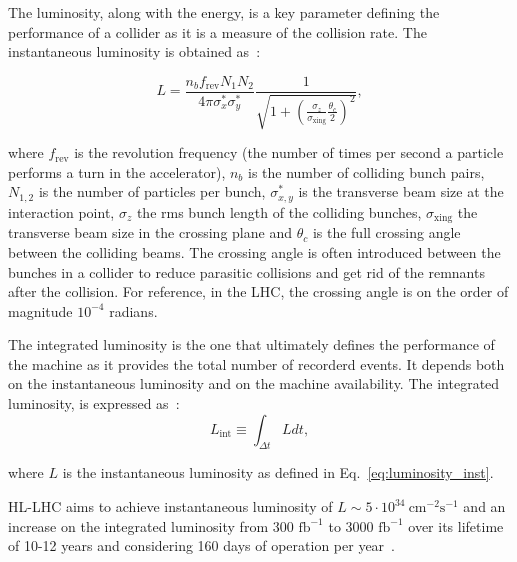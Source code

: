 The luminosity, along with the energy, is a key parameter defining the performance of a collider as it is a measure of the collision rate. The instantaneous luminosity is obtained as~\cite{luminosity}:

\begin{equation}\label{eq:luminosity_inst}
    L = \frac{n_b f_\mathrm{rev}N_1 N_2}{4 \pi \sigma^\ast_x \sigma^\ast_y} \frac{1}{\sqrt{1+\left ( \frac{\sigma_z}{\sigma_\mathrm{xing}} \frac{\theta_c}{2} \right )^2}},
\end{equation}

where $f_{\mathrm{rev}}$ is the revolution frequency (the number of times per second a particle performs a turn in the accelerator), $n_b$ is the number of colliding bunch pairs, $N_{1,2}$ is the number of particles per bunch, $\sigma^\ast_{x,y}$ is the transverse beam size at the interaction point, $\sigma_z$ the rms bunch length of the colliding bunches, $\sigma_{\mathrm{xing}}$ the transverse beam size in the crossing plane and $\theta_c$ is the full crossing angle between the colliding beams. %
 The crossing angle is often introduced between the bunches in a collider to reduce parasitic collisions and get rid of the remnants after the collision. For reference, in the LHC, the crossing angle is on the order of magnitude $10^{-4}$ radians. %

The integrated luminosity is the one that ultimately defines the performance of the machine as it provides the total number of recorderd events. It depends both on the instantaneous luminosity and on the machine availability. The integrated luminosity, is expressed as~\cite{HL_LHC_yellow_report}:
\begin{equation}\label{eq:integrated_luminosity}
    L_\mathrm{int} \equiv \int_{\Delta t} L dt,
\end{equation}

where $L$ is the instantaneous luminosity as defined in Eq.~\eqref{eq:luminosity_inst}.

HL-LHC aims to achieve instantaneous luminosity of $L \sim 5 \cdot 10^{34} \ \mathrm{cm^{-2} s^{-1}}$ and an increase on the integrated luminosity from 300 $\mathrm{fb^{-1}}$ to 3000 $\mathrm{fb^{-1}}$ over its lifetime of 10-12 years and considering 160 days of operation per year~\cite{Brunning_Rossi}. %


